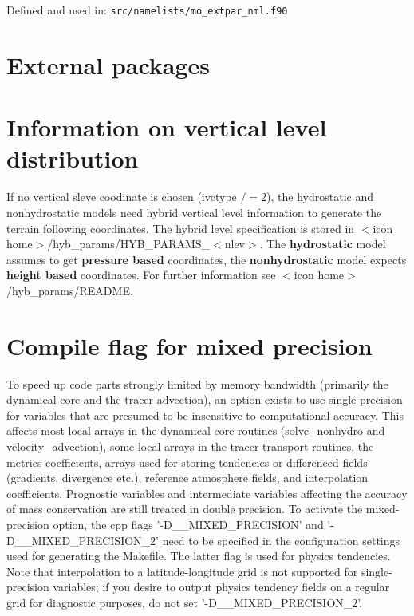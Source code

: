 Defined and used in: \verb+src/namelists/mo_extpar_nml.f90+


\section{External packages}



\section{Information on vertical level distribution}

If no vertical sleve coodinate is chosen (ivctype $/=$2), the hydrostatic and nonhydrostatic models need hybrid vertical level information to generate the
terrain following coordinates. The hybrid level specification is stored in
$<$icon home$>$/hyb\_params/HYB\_PARAMS\_$<$nlev$>$.
The \textbf{hydrostatic} model assumes to get \textbf{pressure based} coordinates, the \textbf{nonhydrostatic}
model expects \textbf{height based} coordinates. For further information see $<$icon home$>$/hyb\_params/README.

\section{Compile flag for mixed precision}

To speed up code parts strongly limited by memory bandwidth (primarily the dynamical core and the tracer advection), 
an option exists to use single precision for variables that are presumed to be insensitive to computational accuracy.
This affects most local arrays in the dynamical core routines (solve\_nonhydro and velocity\_advection), some local
arrays in the tracer transport routines, the metrics coefficients,
arrays used for storing tendencies or differenced fields (gradients, divergence etc.), reference atmosphere fields,
and interpolation coefficients. Prognostic variables and intermediate variables affecting the accuracy of mass conservation
are still treated in double precision. To activate the mixed-precision option, the cpp flags '-D\_\_MIXED\_PRECISION' and  
'-D\_\_MIXED\_PRECISION\_2' need to be specified in the configuration settings used for generating the Makefile.
The latter flag is used for physics tendencies.
Note that interpolation to a latitude-longitude grid is not supported for single-precision variables; if you desire to output
physics tendency fields on a regular grid for diagnostic purposes, do not set '-D\_\_MIXED\_PRECISION\_2'.




